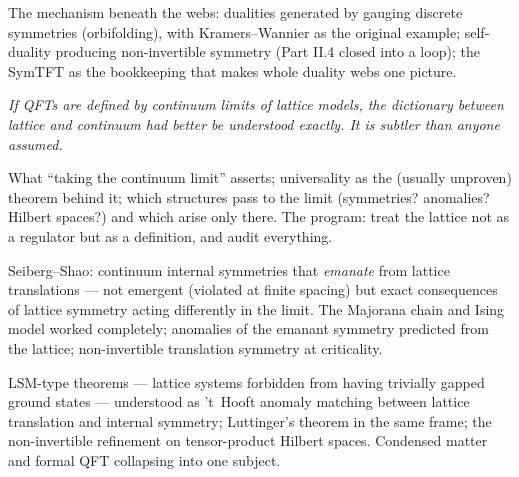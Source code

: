 The mechanism beneath the webs: dualities generated by gauging discrete symmetries (orbifolding), with Kramers--Wannier as the original example; self-duality producing non-invertible symmetry (Part II.4 closed into a loop); the SymTFT as the bookkeeping that makes whole duality webs one picture.


\noin \emph{If QFTs are defined by continuum limits of lattice models, the dictionary between lattice and continuum had better be understood exactly. It is subtler than anyone assumed.}

What ``taking the continuum limit'' asserts; universality as the (usually unproven) theorem behind it; which structures pass to the limit (symmetries? anomalies? Hilbert spaces?) and which arise only there. The program: treat the lattice not as a regulator but as a definition, and audit everything.

Seiberg--Shao: continuum internal symmetries that \emph{emanate} from lattice translations --- not emergent (violated at finite spacing) but exact consequences of lattice symmetry acting differently in the limit. The Majorana chain and Ising model worked completely; anomalies of the emanant symmetry predicted from the lattice; non-invertible translation symmetry at criticality.

LSM-type theorems --- lattice systems forbidden from having trivially gapped ground states --- understood as 't~Hooft anomaly matching between lattice translation and internal symmetry; Luttinger's theorem in the same frame; the non-invertible refinement on tensor-product Hilbert spaces. Condensed matter and formal QFT collapsing into one subject.

